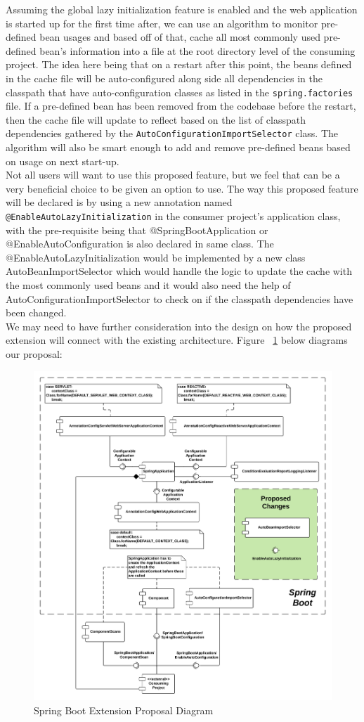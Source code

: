 Assuming the global lazy initialization feature is enabled and the web application is started up for the first time after, we can use an algorithm to monitor pre-defined bean usages and based off of that, cache all most commonly used pre-defined bean's information into a file at the root directory level of the consuming project. The idea here being that on a restart after this point, the beans defined in the cache file will be auto-configured along side all dependencies in the classpath that have auto-configuration classes as listed in the \texttt{spring.factories} file. If a pre-defined bean has been removed from the codebase before the restart, then the cache file will update to reflect based on the list of classpath dependencies gathered by the \texttt{AutoConfigurationImportSelector} class. The algorithm will also be smart enough to add and remove pre-defined beans based on usage on next start-up.\\

Not all users will want to use this proposed feature, but we feel that can be a very beneficial choice to be given an option to use. The way this proposed feature will be declared is by using a new annotation named \texttt{@EnableAutoLazyInitialization} in the consumer project's application class, with the pre-requisite being that @SpringBootApplication or @EnableAutoConfiguration is also declared in same class. The @EnableAutoLazyInitialization would be implemented by a new class AutoBeanImportSelector which would handle the logic to update the cache with the most commonly used beans and it would also need the help of AutoConfigurationImportSelector to check on if the classpath dependencies have been changed.\\

We may need to have further consideration into the design on how the proposed extension will connect with the existing architecture. Figure ~\ref{extension-diagram} below diagrams our proposal:

\begin{figure}[H]
    \centering
    \includegraphics[width=\textwidth]{content/appendices/extension.png}
    \caption{Spring Boot Extension Proposal Diagram}
    \label{extension-diagram}
\end{figure}

